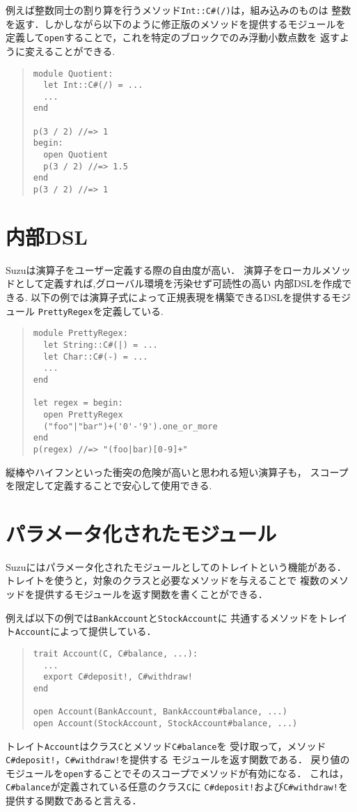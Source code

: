 \documentclass[a4paper,11pt,dvipdfmx]{jreport}
\begin{document}
例えば整数同士の割り算を行うメソッド\verb|Int::C#(/)|は，組み込みのものは
整数を返す．しかしながら以下のように修正版のメソッドを提供するモジュールを
定義して\verb|open|することで，これを特定のブロックでのみ浮動小数点数を
返すように変えることができる.
\begin{quote}
\begin{verbatim}
module Quotient:
  let Int::C#(/) = ...
  ...
end

p(3 / 2) //=> 1
begin:
  open Quotient
  p(3 / 2) //=> 1.5
end
p(3 / 2) //=> 1
\end{verbatim}
\end{quote}

\section{内部DSL}

Suzuは演算子をユーザー定義する際の自由度が高い．
演算子をローカルメソッドとして定義すれば,グローバル環境を汚染せず可読性の高い
内部DSLを作成できる.
以下の例では演算子式によって正規表現を構築できるDSLを提供するモジュール
\verb|PrettyRegex|を定義している.
\begin{quote}
\begin{verbatim}
module PrettyRegex:
  let String::C#(|) = ...
  let Char::C#(-) = ...
  ...
end

let regex = begin:
  open PrettyRegex
  ("foo"|"bar")+('0'-'9').one_or_more
end
p(regex) //=> "(foo|bar)[0-9]+"
\end{verbatim}
\end{quote}
縦棒やハイフンといった衝突の危険が高いと思われる短い演算子も，
スコープを限定して定義することで安心して使用できる.

\section{パラメータ化されたモジュール}

Suzuにはパラメータ化されたモジュールとしてのトレイトという機能がある．
トレイトを使うと，対象のクラスと必要なメソッドを与えることで
複数のメソッドを提供するモジュールを返す関数を書くことができる．

例えば以下の例では\verb|BankAccount|と\verb|StockAccount|に
共通するメソッドをトレイト\verb|Account|によって提供している．
\begin{quote}
\begin{verbatim}
trait Account(C, C#balance, ...):
  ...
  export C#deposit!, C#withdraw!
end

open Account(BankAccount, BankAccount#balance, ...)
open Account(StockAccount, StockAccount#balance, ...)
\end{verbatim}
\end{quote}
トレイト\verb|Account|はクラス\verb|C|とメソッド\verb|C#balance|を
受け取って，メソッド\verb|C#deposit!|，\verb|C#withdraw!|を提供する
モジュールを返す関数である．
戻り値のモジュールを\verb|open|することでそのスコープでメソッドが有効になる．
これは，\verb|C#balance|が定義されている任意のクラス\verb|C|に
\verb|C#deposit!|および\verb|C#withdraw!|を提供する関数であると言える．
\end{document}

